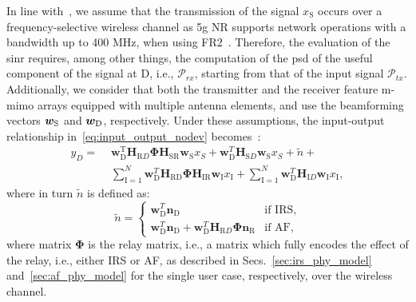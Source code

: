 In line with~\cite{zugno2020implementation}, we assume that the transmission of the signal $x_{\mathrm S}$ occurs over a frequency-selective wireless channel as \gls{5g} NR supports network operations with a bandwidth up to 400 MHz, when using FR2~\cite{38101_1}. 
Therefore, the evaluation of the \gls{sinr} requires, among other things, the computation of the \gls{psd} of the useful component of the signal at D, i.e., $\mathcal{P}_{r x}$, starting from that of the input signal $\mathcal{P}_{t x}$. Additionally, we consider that both the transmitter and the receiver feature \gls{m-mimo} arrays equipped with multiple antenna elements, and use the beamforming vectors $\bm{w}_{\textrm S}$ and $\bm{w}_{\textrm D}$, respectively.
Under these assumptions, the input-output relationship in~\eqref{eq:input_output_nodev} becomes~\cite{bjornson2019intelligent, wu2019intelligent}:
\begin{equation}
\label{eq:mimo_input_output_relay}
\begin{aligned}
	y_{D} = \,\, & \bm{w}_{\mathrm D}^{\mathrm T} \bm{H}_{\mathrm RD} \bm{\Phi} \bm{H}_{\mathrm {SR}} \bm{w}_{\mathrm S} x_{S} + \bm{w}_{\mathrm D}^{T} \bm{H}_{\mathrm SD} \bm{w}_{\mathrm S} x_{S} + \tilde{n} + \\
	& \sum_{\mathrm{I}=1}^{N} \bm{w}_{\mathrm D}^{T} \bm{H}_{\mathrm {RD}} \bm{\Phi} \bm{H}_{\mathrm {IR}}  \bm{w}_{\mathrm I} x_{\mathrm I} + \sum_{\mathrm{I}=1}^{N} \bm{w}_{\mathrm D}^{T} \bm{H}_{\mathrm ID}  \bm{w}_{\mathrm I} x_{\mathrm I},
\end{aligned}
\end{equation}
where in turn $\tilde{n}$ is defined as:
\[ 
\tilde{n} = 
\begin{cases}
    \bm{w}_{\mathrm D}^{T} \bm{n}_{\mathrm D}		& \text{if IRS}, \\
    \bm{w}_{\mathrm D}^{T} \bm{n}_{\mathrm D} + \bm{w}_{\mathrm D}^{T} \bm{H}_{\mathrm RD} \bm{\Phi} \bm{n}_{\mathrm R}      & \text{if AF},
\end{cases}
\]
where matrix $\bm{\Phi}$ is the relay matrix, i.e., a matrix which fully encodes the effect of the relay, i.e., either IRS or AF, as described in Secs.~\ref{sec:irs_phy_model} and~\ref{sec:af_phy_model} for the single user case, respectively, over the wireless channel. 
